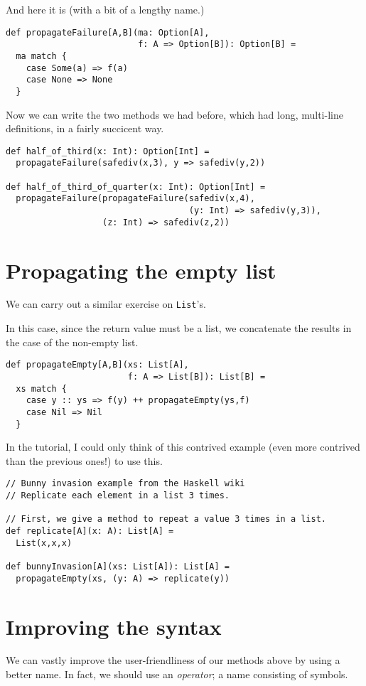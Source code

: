 \documentclass[11pt]{article}
\begin{document}
And here it is (with a bit of a lengthy name.)
\begin{verbatim}
def propagateFailure[A,B](ma: Option[A],
                          f: A => Option[B]): Option[B] =
  ma match {
    case Some(a) => f(a)
    case None => None
  }
\end{verbatim}

Now we can write the two methods we had before,
which had long, multi-line definitions,
in a fairly succicent way.
\begin{verbatim}
def half_of_third(x: Int): Option[Int] =
  propagateFailure(safediv(x,3), y => safediv(y,2))

def half_of_third_of_quarter(x: Int): Option[Int] =
  propagateFailure(propagateFailure(safediv(x,4),
                                    (y: Int) => safediv(y,3)),
                   (z: Int) => safediv(z,2))
\end{verbatim}

\section{Propagating the empty list}
\label{sec:org0d4f8f0}
We can carry out a similar exercise on \texttt{List}'s.

In this case, since the return value must be a list,
we concatenate the results in the case of the non-empty list.
\begin{verbatim}
def propagateEmpty[A,B](xs: List[A],
                        f: A => List[B]): List[B] =
  xs match {
    case y :: ys => f(y) ++ propagateEmpty(ys,f)
    case Nil => Nil
  }
\end{verbatim}

In the tutorial, I could only think of this contrived example
(even more contrived than the previous ones!)
to use this.
\begin{verbatim}
// Bunny invasion example from the Haskell wiki
// Replicate each element in a list 3 times.

// First, we give a method to repeat a value 3 times in a list.
def replicate[A](x: A): List[A] =
  List(x,x,x)

def bunnyInvasion[A](xs: List[A]): List[A] =
  propagateEmpty(xs, (y: A) => replicate(y))
\end{verbatim}

\section{Improving the syntax}
\label{sec:org8105288}
We can vastly improve the user-friendliness of our
methods above by using a better name.
In fact, we should use an \emph{operator}; a name consisting of symbols.
\end{document}

